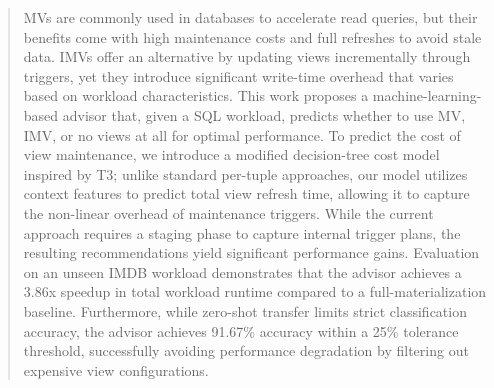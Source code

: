 \begin{abstract}
    
\ac{MV}s are commonly used in databases to accelerate read queries, but their benefits come with high maintenance costs and full refreshes to avoid stale data. \ac{IMV}s offer an alternative by updating views incrementally through triggers, yet they introduce significant write-time overhead that varies based on workload characteristics. This work proposes a machine-learning-based advisor that, given a SQL workload, predicts whether to use \ac{MV}, \ac{IMV}, or no views at all for optimal performance. To predict the cost of view maintenance, we introduce a modified decision-tree cost model inspired by T3; unlike standard per-tuple approaches, our model utilizes context features to predict total view refresh time, allowing it to capture the non-linear overhead of maintenance triggers. While the current approach requires a staging phase to capture internal trigger plans, the resulting recommendations yield significant performance gains. Evaluation on an unseen IMDB workload demonstrates that the advisor achieves a 3.86x speedup in total workload runtime compared to a full-materialization baseline. Furthermore, while zero-shot transfer limits strict classification accuracy, the advisor achieves 91.67\% accuracy within a 25\% tolerance threshold, successfully avoiding performance degradation by filtering out expensive view configurations.

\end{abstract}
